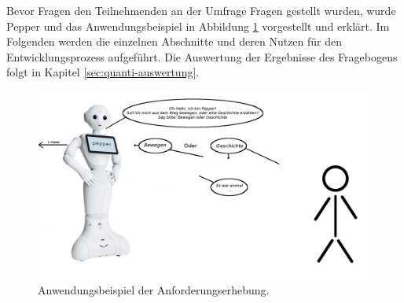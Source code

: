 Bevor Fragen den Teilnehmenden an der Umfrage Fragen gestellt wurden, wurde Pepper und das Anwendungsbeispiel in Abbildung \ref{fig:umfrage-anwendungsbeispiel} vorgestellt und erklärt. Im Folgenden werden die einzelnen Abschnitte und deren Nutzen für den Entwicklungsprozess aufgeführt. Die Auswertung der Ergebnisse des Fragebogens folgt in Kapitel \ref{sec:quanti-auswertung}.

\begin{figure}
	\centering
	\includegraphics[width=13cm]{Plots/umfrage-anwendungsbeispiel.png}
	\caption{Anwendungsbeispiel der Anforderungserhebung.}
	\label{fig:umfrage-anwendungsbeispiel}
\end{figure}

